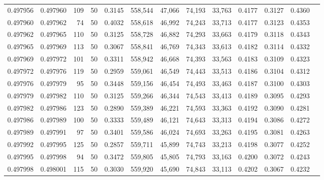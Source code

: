 \begin{tabular}{rrrrrrrrrrrrr}
0.497956 & 0.497960 &   109 &  50 &                                     0.3145 & 558,544 &  47,066 &  74,193 &  33,763 & 0.4177 & 0.3127 & 0.4360 \\
0.497960 & 0.497962 &    74 &  50 &                                     0.4032 & 558,618 &  46,992 &  74,243 &  33,713 & 0.4177 & 0.3123 & 0.4353 \\
0.497962 & 0.497965 &   110 &  50 &                                     0.3125 & 558,728 &  46,882 &  74,293 &  33,663 & 0.4179 & 0.3118 & 0.4343 \\
0.497965 & 0.497969 &   113 &  50 &                                     0.3067 & 558,841 &  46,769 &  74,343 &  33,613 & 0.4182 & 0.3114 & 0.4332 \\
0.497969 & 0.497972 &   101 &  50 &                                     0.3311 & 558,942 &  46,668 &  74,393 &  33,563 & 0.4183 & 0.3109 & 0.4323 \\
0.497972 & 0.497976 &   119 &  50 &                                     0.2959 & 559,061 &  46,549 &  74,443 &  33,513 & 0.4186 & 0.3104 & 0.4312 \\
0.497976 & 0.497979 &    95 &  50 &                                     0.3448 & 559,156 &  46,454 &  74,493 &  33,463 & 0.4187 & 0.3100 & 0.4303 \\
0.497979 & 0.497982 &   110 &  50 &                                     0.3125 & 559,266 &  46,344 &  74,543 &  33,413 & 0.4189 & 0.3095 & 0.4293 \\
0.497982 & 0.497986 &   123 &  50 &                                     0.2890 & 559,389 &  46,221 &  74,593 &  33,363 & 0.4192 & 0.3090 & 0.4281 \\
0.497986 & 0.497989 &   100 &  50 &                                     0.3333 & 559,489 &  46,121 &  74,643 &  33,313 & 0.4194 & 0.3086 & 0.4272 \\
0.497989 & 0.497991 &    97 &  50 &                                     0.3401 & 559,586 &  46,024 &  74,693 &  33,263 & 0.4195 & 0.3081 & 0.4263 \\
0.497992 & 0.497995 &   125 &  50 &                                     0.2857 & 559,711 &  45,899 &  74,743 &  33,213 & 0.4198 & 0.3077 & 0.4252 \\
0.497995 & 0.497998 &    94 &  50 &                                     0.3472 & 559,805 &  45,805 &  74,793 &  33,163 & 0.4200 & 0.3072 & 0.4243 \\
0.497998 & 0.498001 &   115 &  50 &                                     0.3030 & 559,920 &  45,690 &  74,843 &  33,113 & 0.4202 & 0.3067 & 0.4232 \\

\end{tabular}
